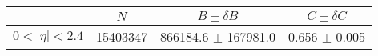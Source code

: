 \begin{tabular}{lccc}
\hline
    &   $N$   & $B \pm \delta B$  &  $C \pm \delta C$ \\
\hline
$0 < |\eta| <2.4$              & 15403347   & 866184.6   $\pm$ 167981.0 & 0.656      $\pm$ 0.005 \\
\hline
\end{tabular}
